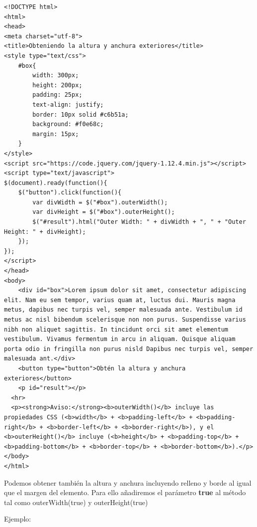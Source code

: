 \documentclass[11pt]{article}
\begin{document}
\begin{verbatim}
<!DOCTYPE html>
<html>
<head>
<meta charset="utf-8">
<title>Obteniendo la altura y anchura exteriores</title>
<style type="text/css">
    #box{
        width: 300px;
        height: 200px;
        padding: 25px;
        text-align: justify;
        border: 10px solid #c6b51a;
        background: #f0e68c;
        margin: 15px;
    }        
</style>
<script src="https://code.jquery.com/jquery-1.12.4.min.js"></script>
<script type="text/javascript">
$(document).ready(function(){
    $("button").click(function(){
        var divWidth = $("#box").outerWidth();
        var divHeight = $("#box").outerHeight();
        $("#result").html("Outer Width: " + divWidth + ", " + "Outer Height: " + divHeight);
    });
});
</script>
</head>
<body>
    <div id="box">Lorem ipsum dolor sit amet, consectetur adipiscing elit. Nam eu sem tempor, varius quam at, luctus dui. Mauris magna metus, dapibus nec turpis vel, semper malesuada ante. Vestibulum id metus ac nisl bibendum scelerisque non non purus. Suspendisse varius nibh non aliquet sagittis. In tincidunt orci sit amet elementum vestibulum. Vivamus fermentum in arcu in aliquam. Quisque aliquam porta odio in fringilla non purus nisld Dapibus nec turpis vel, semper malesuada ant.</div>
    <button type="button">Obtén la altura y anchura exteriores</button>
    <p id="result"></p>
  <hr>
  <p><strong>Aviso:</strong><b>outerWidth()</b> incluye las propiedades CSS (<b>width</b> + <b>padding-left</b> + <b>padding-right</b> + <b>border-left</b> + <b>border-right</b>), y el <b>outerHeight()</b> incluye (<b>height</b> + <b>padding-top</b> + <b>padding-bottom</b> + <b>border-top</b> + <b>border-bottom</b>).</p>
</body>
</html>                                		
\end{verbatim}

Podemos obtener también la altura y anchura incluyendo relleno y borde al igual que el margen del elemento. Para ello añadiremos el parámetro \textbf{true} al método tal como outerWidth(true) y outerHeight(true)

Ejemplo:
\end{document}

